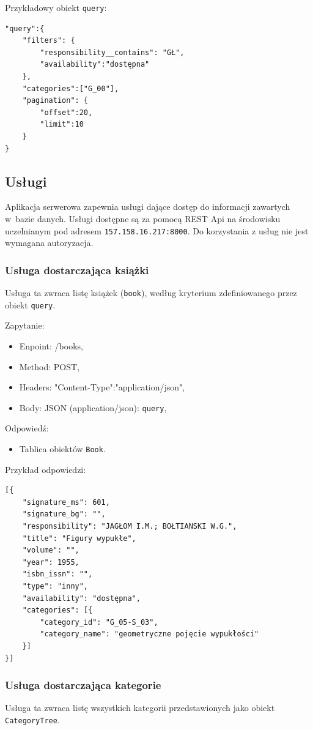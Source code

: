 \documentclass[twoside]{projektInzynierskiMS}
\begin{document}
Przykładowy obiekt \verb`query`:

\begin{verbatim}
"query":{
    "filters": {
        "responsibility__contains": "GŁ",
        "availability":"dostępna"
    },
    "categories":["G_00"],
    "pagination": {
        "offset":20,
        "limit":10
    }
}
\end{verbatim}

\subsection{Usługi}
Aplikacja serwerowa zapewnia usługi dające dostęp do informacji zawartych w~bazie danych. Usługi dostępne są za pomocą REST Api na środowisku uczelnianym pod adresem \verb`157.158.16.217:8000`. Do korzystania z usług nie jest wymagana autoryzacja.

\subsubsection{Usługa dostarczająca książki}
Usługa ta zwraca listę książek (\verb`book`), według kryterium zdefiniowanego przez obiekt \verb`query`.

Zapytanie:
\begin{itemize}
	\item Enpoint: /books,
	\item Method: POST,
	\item Headers: "Content-Type":"application/json",
	\item Body: JSON (application/json): \verb`query`,
\end{itemize}

Odpowiedź:
\begin{itemize}
	\item Tablica obiektów \verb`Book`.
\end{itemize}

Przykład odpowiedzi:
\begin{verbatim}
[{
    "signature_ms": 601,
    "signature_bg": "",
    "responsibility": "JAGŁOM I.M.; BOŁTIANSKI W.G.",
    "title": "Figury wypukłe",
    "volume": "",
    "year": 1955,
    "isbn_issn": "",
    "type": "inny",
    "availability": "dostępna",
    "categories": [{
        "category_id": "G_05-S_03",
        "category_name": "geometryczne pojęcie wypukłości"
    }]
}]
\end{verbatim}

\subsubsection{Usługa dostarczająca kategorie}
Usługa ta zwraca listę wszystkich kategorii przedstawionych jako obiekt \verb`CategoryTree`. 
\end{document}
